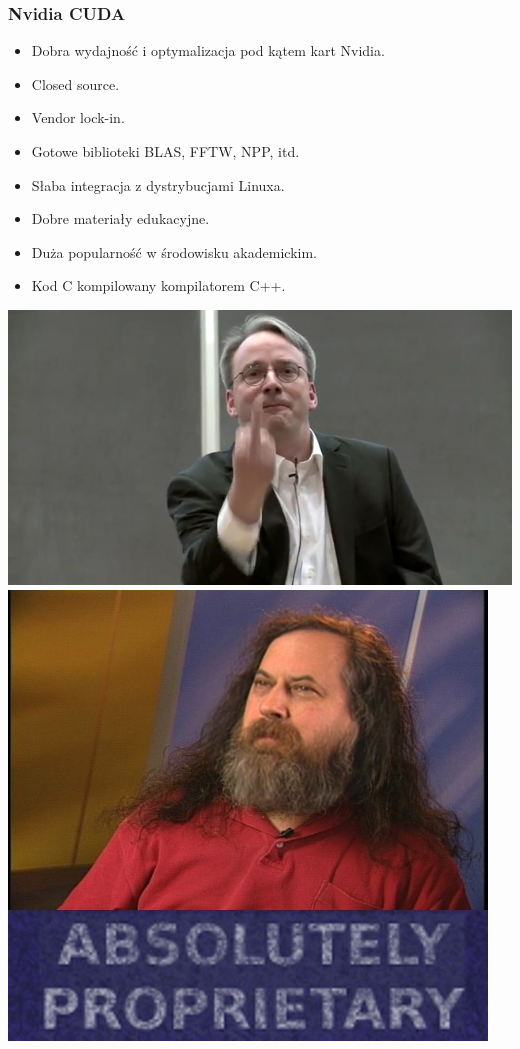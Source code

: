 \documentclass[dvipsnames,table]{beamer}
\begin{document}
\begin{frame}
	\frametitle{Nvidia CUDA}
\begin{itemize}
	\item Dobra wydajność i optymalizacja pod kątem kart Nvidia.
	\item Closed source.
	\item Vendor lock-in.
	\item Gotowe biblioteki BLAS, FFTW, NPP, itd.
	\item Słaba integracja z dystrybucjami Linuxa.
	\item Dobre materiały edukacyjne.
	\item Duża popularność w środowisku akademickim.
	\item Kod C kompilowany kompilatorem C++. \Annoey
\end{itemize}
\begin{center}
\includegraphics[scale=0.25]{img-torvalds.png}
\includegraphics[scale=0.19]{img-stallman.jpg}
\end{center}


\end{frame}
\end{document}
